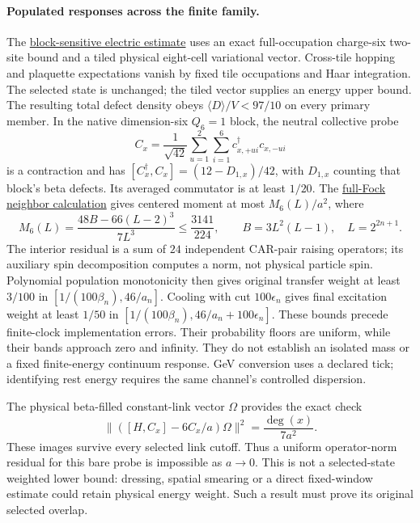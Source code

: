 \paragraph{Populated responses across the finite family.}
The \href{https://github.com/FloatingPragma/observer-patch-holography/blob/main/model/particle_primary_refinement_response/PROOF.md}{block-sensitive electric estimate}
uses an exact full-occupation charge-six two-site bound and a tiled
physical eight-cell variational vector. Cross-tile hopping and plaquette
expectations vanish by fixed tile occupations and Haar integration.
The selected state is unchanged; the tiled vector supplies an energy
upper bound. The resulting total defect density obeys
$\langle D\rangle/V<97/10$ on every primary member. In the native
dimension-six $Q_6=1$ block, the neutral collective probe
\[
 C_x=\frac1{\sqrt{42}}\sum_{u=1}^2\sum_{i=1}^6
            c^\dagger_{x,+u i}c_{x,-u i}
\]
is a contraction and has
$[C_x^\dagger,C_x]=(12-D_{1,x})/42$, with $D_{1,x}$ counting
that block's beta defects.
Its averaged commutator is at least $1/20$. The
\href{https://github.com/FloatingPragma/observer-patch-holography/blob/main/model/particle_primary_energy_tightness/PROOF.md}{full-Fock neighbor calculation}
gives centered moment at most $M_6(L)/a^2$, where
\[
 M_6(L)=\frac{48B-66(L-2)^3}{7L^3}\le\frac{3141}{224},
 \qquad B=3L^2(L-1),\quad L=2^{2n+1}.
\]
The interior residual is a sum of $24$ independent CAR-pair raising
operators; its auxiliary spin decomposition computes a norm, not
physical particle spin. Polynomial population monotonicity then gives
original transfer weight at least $3/100$ in $[1/(100\beta_n),46/a_n]$.
Cooling with cut $100\epsilon_n$ gives final excitation weight at least
$1/50$ in $[1/(100\beta_n),46/a_n+100\epsilon_n]$.
These bounds precede finite-clock implementation errors. Their probability
floors are uniform, while their bands approach zero and infinity. They
do not establish an isolated mass or a fixed finite-energy continuum
response. GeV conversion uses a declared tick; identifying rest energy
requires the same channel's controlled dispersion.

The physical beta-filled constant-link vector $\Omega$ provides the
exact check
\[
 \|([H,C_x]-6C_x/a)\Omega\|^2=\frac{\deg(x)}{7a^2}.
\]
These images survive every selected link cutoff. Thus a uniform
operator-norm residual for this bare probe is impossible as $a\to0$.
This is not a selected-state weighted lower bound: dressing, spatial
smearing or a direct fixed-window estimate could retain physical
energy weight. Such a result must prove its original selected overlap.

